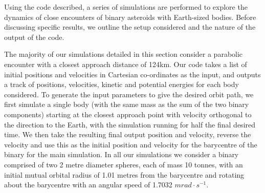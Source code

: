 \documentclass[letterpaper, preprint, paper,11pt]{AAS}	%
\begin{document}
Using the code described, a series of simulations are performed to explore the dynamics of close encounters of binary asteroids with Earth-sized bodies. Before discussing specific results, we outline the setup considered and the nature of the output of the code.

The majority of our simulations detailed in this section consider a parabolic encounter with a closest approach distance of 124km. Our code takes a list of initial positions and velocities in Cartesian co-ordinates as the input, and outputs a track of positions, velocities, kinetic and potential energies for each body considered. To generate the input parameters to give the desired orbit path, we first simulate a single body (with the same mass as the sum of the two binary components) starting at the closest approach point with velocity orthogonal to the direction to the Earth, with the simulation running for half the final desired time. We then take the resulting final output position and velocity, reverse the velocity and use this as the initial position and velocity for the barycentre of the binary for the main simulation. In all our simulations we consider a binary comprised of two 2 metre diameter spheres, each of mass 10 tonnes, with an initial mutual orbital radius of 1.01 metres from the barycentre and rotating about the barycentre with an angular speed of 1.7032  $mrad\cdot s^{-1}$.
\end{document}

